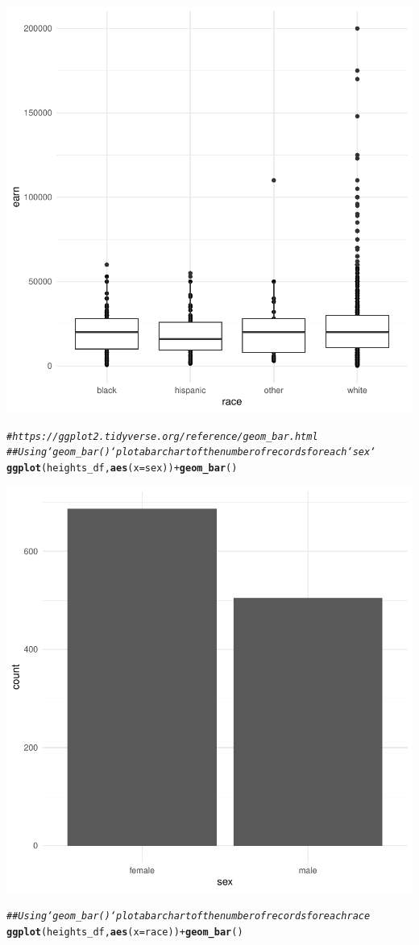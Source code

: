 \documentclass{article}\usepackage[]{graphicx}\usepackage[]{xcolor}
\makeatletter
\newcommand{\hlcom}[1]{\textcolor[rgb]{0.678,0.584,0.686}{\textit{#1}}}%
\newcommand{\hlopt}[1]{\textcolor[rgb]{0,0,0}{#1}}%
\newcommand{\hlstd}[1]{\textcolor[rgb]{0.345,0.345,0.345}{#1}}%
\newcommand{\hlkwc}[1]{\textcolor[rgb]{0.333,0.667,0.333}{#1}}%
\newcommand{\hlkwd}[1]{\textcolor[rgb]{0.737,0.353,0.396}{\textbf{#1}}}%
\newenvironment{kframe}{%
 \def\at@end@of@kframe{}%
 \ifinner\ifhmode%
  \def\at@end@of@kframe{\end{minipage}}%
  \begin{minipage}{\columnwidth}%
 \fi\fi%
 \def\FrameCommand##1{\hskip\@totalleftmargin \hskip-\fboxsep
 \colorbox{shadecolor}{##1}\hskip-\fboxsep
     \hskip-\linewidth \hskip-\@totalleftmargin \hskip\columnwidth}%
 \MakeFramed {\advance\hsize-\width
   \@totalleftmargin\z@ \linewidth\hsize
   \@setminipage}}%
 {\par\unskip\endMakeFramed%
 \at@end@of@kframe}
\newenvironment{knitrout}{}{} %
\makeatother
\begin{document}
\begin{knitrout}
{\centering \includegraphics[width=.6\linewidth]{figure/assignment-04-Quintero-Vasquez-Johnatan-Rnwauto-report-2} 

}


\begin{kframe}\begin{alltt}
\hlcom{# https://ggplot2.tidyverse.org/reference/geom_bar.html}
\hlcom{## Using `geom_bar()` plot a bar chart of the number of records for each `sex`}
\hlkwd{ggplot}\hlstd{(heights_df,} \hlkwd{aes}\hlstd{(}\hlkwc{x} \hlstd{= sex))} \hlopt{+} \hlkwd{geom_bar}\hlstd{()}
\end{alltt}
\end{kframe}

{\centering \includegraphics[width=.6\linewidth]{figure/assignment-04-Quintero-Vasquez-Johnatan-Rnwauto-report-3} 

}


\begin{kframe}\begin{alltt}
\hlcom{## Using `geom_bar()` plot a bar chart of the number of records for each race}
\hlkwd{ggplot}\hlstd{(heights_df,} \hlkwd{aes}\hlstd{(}\hlkwc{x} \hlstd{= race))} \hlopt{+} \hlkwd{geom_bar}\hlstd{()}
\end{alltt}
\end{kframe}


\end{knitrout}
\end{document}
